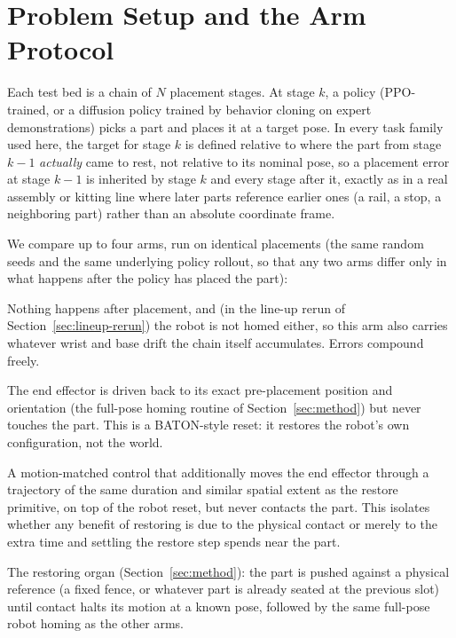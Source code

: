 \documentclass[11pt]{article}
\begin{document}
\section{Problem Setup and the Arm Protocol}
\label{sec:setup}

Each test bed is a chain of $N$ placement stages. At stage $k$, a policy
(PPO-trained, or a diffusion policy trained by behavior cloning on expert
demonstrations) picks a part and places it at a target pose. In every task
family used here, the target for stage $k$ is defined relative to where the
part from stage $k-1$ \emph{actually} came to rest, not relative to its
nominal pose, so a placement error at stage $k-1$ is inherited by stage $k$
and every stage after it, exactly as in a real assembly or kitting line
where later parts reference earlier ones (a rail, a stop, a neighboring
part) rather than an absolute coordinate frame.

We compare up to four arms, run on identical placements (the same random
seeds and the same underlying policy rollout, so that any two arms differ
only in what happens after the policy has placed the part):

\begin{description}[leftmargin=1.2em]
  \item[bare / no reset] Nothing happens after placement, and (in the
  line-up rerun of Section~\ref{sec:lineup-rerun}) the robot is not homed
  either, so this arm also carries whatever wrist and base drift the chain
  itself accumulates. Errors compound freely.
  \item[robot reset (home)] The end effector is driven back to its exact
  pre-placement position and orientation (the full-pose homing routine of
  Section~\ref{sec:method}) but never touches the part. This is a
  BATON-style reset: it restores the robot's own configuration, not the
  world.
  \item[no-op] A motion-matched control that additionally moves the end
  effector through a trajectory of the same duration and similar spatial
  extent as the restore primitive, on top of the robot reset, but never
  contacts the part. This isolates whether any benefit of restoring is due
  to the physical contact or merely to the extra time and settling the
  restore step spends near the part.
  \item[restore] The restoring organ (Section~\ref{sec:method}): the part
  is pushed against a physical reference (a fixed fence, or whatever part
  is already seated at the previous slot) until contact halts its motion at
  a known pose, followed by the same full-pose robot homing as the other
  arms.
\end{description}
\end{document}
